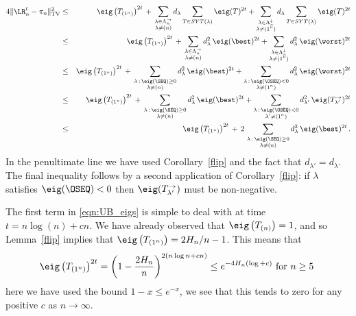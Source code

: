 \documentclass[11pt]{report}
\begin{document}
\begin{eqnarray}
4\lVert \LR^{t}_{n} -\pi_{n} \rVert_{\textnormal{TV}}^{2} & \leq & 
\eig\left(T_{(1^n)}\right)^{2t} \,+ \,
\sum_{\substack{\lambda\in \Lambda_n^\rightarrow\\\lambda \neq(n)}} 
d_{\lambda} \sum_{T \in SYT(\lambda)} \eig(T)^{2t}
+ \sum_{\substack{\lambda\in \Lambda_n^\downarrow\\\lambda \neq(1^n)}} 
d_{\lambda} \sum_{T \in SYT(\lambda)} \eig(T)^{2t}\nonumber \\
& \leq &   \eig\left(T_{(1^n)}\right)^{2t} \,+ \,
\sum_{\substack{\lambda\in \Lambda_n^\rightarrow\\\lambda \neq(n)}} 
d_{\lambda}^2 \,\eig(\best)^{2t}
+ \sum_{\substack{\lambda\in \Lambda_n^\downarrow\\\lambda \neq(1^n)}} 
d_{\lambda}^2 \,\eig(\worst)^{2t} \nonumber\\	
& \leq & \eig\left(T_{(1^n)}\right)^{2t} \,+ \,
\sum_{\substack{\lambda\,:\,\eig(\SEQ) \geq 0\\ \lambda \neq (n)}} 
d_{\lambda}^{2}  \,	\eig(\best)^{2t} 
+ \sum_{\substack{\lambda\,:\,\eig(\OSEQ) < 0 \\ \lambda \neq(1^n)}} 
d_{\lambda}^{2} \,\eig(\worst)^{2t} \nonumber\\
& \leq &   \eig\left(T_{(1^n)}\right)^{2t} \,+ \,
\sum_{\substack{\lambda\,:\,\eig(\SEQ) \geq 0\\ \lambda \neq (n)}} 
d_{\lambda}^2 \,\eig(\best)^{2t}
+ \sum_{\substack{\lambda\,:\,\eig(\OSEQ) < 0 \\ \lambda'\neq(1^{n})}} 
d_{\lambda'}^2 \,\eig(T^\rightarrow_{\lambda'})^{2t} \nonumber \\
& \leq & \eig\left(T_{(1^n)}\right)^{2t} \,+ \,
2\,\sum_{\substack{\lambda\,:\,\eig(\SEQ) \geq 0\\ \lambda \neq (n)}} 
d_{\lambda}^{2}  \,	\eig(\best)^{2t} \,. \label{eqn:UB_eigs}
\end{eqnarray}
In the penultimate line we have used Corollary~\ref{flip} and the fact that 
$d_{\lambda'}=d_\lambda$. The final inequality follows by a second 
application of Corollary~\ref{flip}: if $\lambda$ satisfies $\eig(\OSEQ)<0$ 
then $\eig(T^\rightarrow_{\lambda'})$ must be non-negative.

The first term in \eqref{eqn:UB_eigs} is simple to deal with at time $t=n\log(n)+cn$. We have already observed that $\eig\left(T_{(n)}\right) = 1$, and so Lemma~\ref{flip} implies that $\eig\left(T_{(1^{n})}\right) = 2 H_{n}/n-1$. This means that
\begin{equation}\label{eqn:first_partition}
\eig\left(T_{(1^n)}\right)^{2t} = 
\left(1 - 
\frac{2H_{n}}{n} \right)^{2(n\log n + cn)} \leq e^{-4 H_{n} (\log + c)} \textnormal{ for $n\geq 5$ }
\end{equation}
here we have used the bound $1-x \leq e^{-x}$, we see that this tends to 
zero 
for any positive $c$ as $n\to\infty$.
\end{document}
